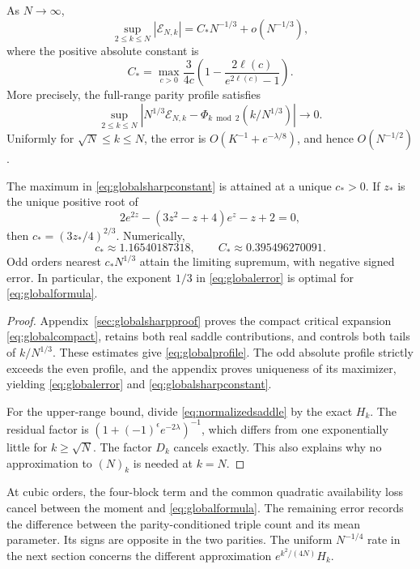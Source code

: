 \begin{theorem}\label{thm:global}
As $N\to\infty$,
\begin{equation}\label{eq:globalerror}
\sup_{2\le k\le N}|\mathcal E_{N,k}|
=C_*N^{-1/3}+o(N^{-1/3}),
\end{equation}
where the positive absolute constant is
\begin{equation}\label{eq:globalsharpconstant}
C_*=\max_{c>0}\frac3{4c}
\left(1-\frac{2\ell(c)}{e^{2\ell(c)}-1}\right).
\end{equation}
More precisely, the full-range parity profile satisfies
\begin{equation}\label{eq:globalprofile}
\sup_{2\le k\le N}
\left|N^{1/3}\mathcal E_{N,k}
-\Phi_{k\bmod2}(k/N^{1/3})\right|\longrightarrow0.
\end{equation}
Uniformly for $\sqrt N\le k\le N$, the error is
$O(K^{-1}+e^{-\lambda/8})$, and hence $O(N^{-1/2})$.

The maximum in \eqref{eq:globalsharpconstant} is attained at a unique $c_*>0$. If $z_*$ is the unique positive root of
\begin{equation}\label{eq:globalmaxequation}
2e^{2z}-(3z^2-z+4)e^z-z+2=0,
\end{equation}
then $c_*=(3z_*/4)^{2/3}$. Numerically,
\[
c_*\approx1.16540187318,\qquad C_*\approx0.395496270091.
\]
Odd orders nearest $c_*N^{1/3}$ attain the limiting supremum, with negative signed error. In particular, the exponent $1/3$ in \eqref{eq:globalerror} is optimal for \eqref{eq:globalformula}.
\end{theorem}
\begin{proof}
Appendix~\ref{sec:globalsharpproof} proves the compact critical expansion \eqref{eq:globalcompact}, retains both real saddle contributions, and controls both tails of $k/N^{1/3}$. These estimates give \eqref{eq:globalprofile}. The odd absolute profile strictly exceeds the even profile, and the appendix proves uniqueness of its maximizer, yielding \eqref{eq:globalerror} and \eqref{eq:globalsharpconstant}.

For the upper-range bound, divide \eqref{eq:normalizedsaddle} by the exact $H_k$. The residual factor is $(1+(-1)^\epsilon e^{-2\lambda})^{-1}$, which differs from one exponentially little for $k\ge\sqrt N$. The factor $D_k$ cancels exactly. This also explains why no approximation to $(N)_k$ is needed at $k=N$.
\end{proof}

At cubic orders, the four-block term and the common quadratic availability loss cancel between the moment and \eqref{eq:globalformula}. The remaining error records the difference between the parity-conditioned triple count and its mean parameter. Its signs are opposite in the two parities. The uniform $N^{-1/4}$ rate in the next section concerns the different approximation $e^{k^2/(4N)}H_k$.

